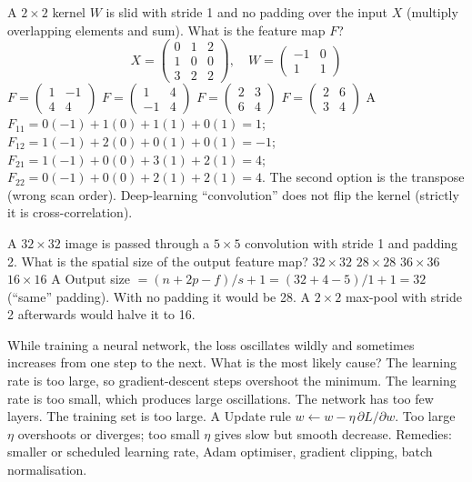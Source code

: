 {A $2\times2$ kernel $W$ is slid with stride 1 and no padding over the input $X$ (multiply overlapping elements and sum). What is the feature map $F$?
	\[
	X=\begin{pmatrix}0&1&2\\1&0&0\\3&2&2\end{pmatrix},\quad
	W=\begin{pmatrix}-1&0\\1&1\end{pmatrix}
	\]}
{$F=\begin{pmatrix}1&-1\\4&4\end{pmatrix}$}
{$F=\begin{pmatrix}1&4\\-1&4\end{pmatrix}$}
{$F=\begin{pmatrix}2&3\\6&4\end{pmatrix}$}
{$F=\begin{pmatrix}2&6\\3&4\end{pmatrix}$}
{A}
{$F_{11}=0(-1)+1(0)+1(1)+0(1)=1$; $F_{12}=1(-1)+2(0)+0(1)+0(1)=-1$; $F_{21}=1(-1)+0(0)+3(1)+2(1)=4$; $F_{22}=0(-1)+0(0)+2(1)+2(1)=4$. The second option is the transpose (wrong scan order). Deep-learning ``convolution'' does not flip the kernel (strictly it is cross-correlation).}

{A $32\times32$ image is passed through a $5\times5$ convolution with stride 1 and padding 2. What is the spatial size of the output feature map?}
{$32\times32$}
{$28\times28$}
{$36\times36$}
{$16\times16$}
{A}
{Output size $=(n+2p-f)/s+1=(32+4-5)/1+1=32$ (``same'' padding). With no padding it would be 28. A $2\times2$ max-pool with stride 2 afterwards would halve it to 16.}

{While training a neural network, the loss oscillates wildly and sometimes increases from one step to the next. What is the most likely cause?}
{The learning rate is too large, so gradient-descent steps overshoot the minimum.}
{The learning rate is too small, which produces large oscillations.}
{The network has too few layers.}
{The training set is too large.}
{A}
{Update rule $w\leftarrow w-\eta\,\partial L/\partial w$. Too large $\eta$ overshoots or diverges; too small $\eta$ gives slow but smooth decrease. Remedies: smaller or scheduled learning rate, Adam optimiser, gradient clipping, batch normalisation.}

